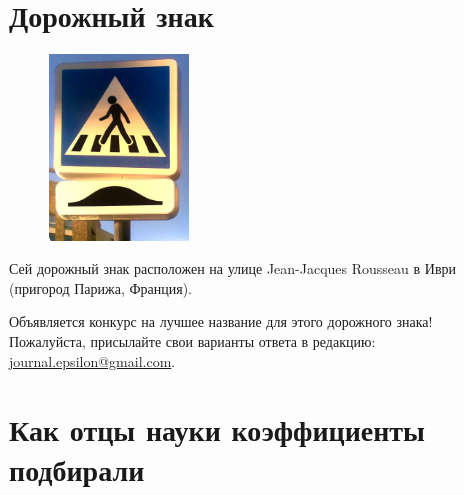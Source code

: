 \documentclass[11pt]{article}
\date{\vspace{-5.5ex}}
\begin{document}
	
	
	\AUTHOR{}{}
	\SHORTAUTHOR{}
	
\DoFirstPageTechnicalStuff
\vspace{-10ex}

\section{Дорожный знак}

\begin{figure}\centering\vspace{-2.2ex}
	\includegraphics[width=3.7cm]{Normal-warning2.jpg}\vspace{-5ex}
\end{figure}
Сей дорожный знак расположен на улице Jean-Jacques Rousseau в Иври (пригород Парижа, Франция).

Объявляется конкурс на лучшее название для этого дорожного знака! Пожалуйста, присылайте свои варианты ответа в редакцию: \href{mailto:journal.epsilon@gmail.com}{journal.epsilon@gmail.com}. 

\section{Как отцы науки коэффициенты подбирали}

\end{document}
